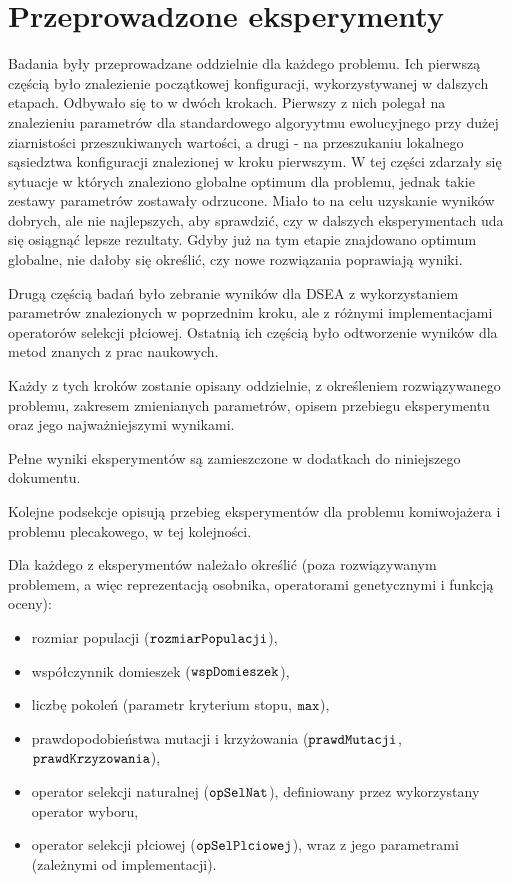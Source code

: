 \documentclass[./FM_mgr.tex]{subfiles}
\begin{document}
	\section{Przeprowadzone eksperymenty}
	
	Badania były przeprowadzane oddzielnie dla każdego problemu.
	Ich pierwszą częścią było znalezienie początkowej konfiguracji, wykorzystywanej w dalszych etapach.
	Odbywało się to w dwóch krokach.
	Pierwszy z nich polegał na znalezieniu parametrów dla standardowego algoryytmu ewolucyjnego przy dużej ziarnistości przeszukiwanych wartości, a drugi - na przeszukaniu lokalnego sąsiedztwa konfiguracji znalezionej w kroku pierwszym.
	W tej części zdarzały się sytuacje w których znaleziono globalne optimum dla problemu, jednak takie zestawy parametrów zostawały odrzucone.
	Miało to na celu uzyskanie wyników dobrych, ale nie najlepszych, aby sprawdzić, czy w dalszych eksperymentach uda się osiągnąć lepsze rezultaty.
	Gdyby już na tym etapie znajdowano optimum globalne, nie dałoby się określić, czy nowe rozwiązania poprawiają wyniki.
	
	Drugą częścią badań było zebranie wyników dla DSEA z wykorzystaniem parametrów znalezionych w poprzednim kroku, ale z różnymi implementacjami operatorów selekcji płciowej.
	Ostatnią ich częścią było odtworzenie wyników dla metod znanych z prac naukowych.
	
	Każdy z tych kroków zostanie opisany oddzielnie, z określeniem rozwiązywanego problemu, zakresem zmienianych parametrów, opisem przebiegu eksperymentu oraz jego najważniejszymi wynikami.
	
	Pełne wyniki eksperymentów są zamieszczone w dodatkach do niniejszego dokumentu.
	
	Kolejne podsekcje opisują przebieg eksperymentów dla problemu komiwojażera i problemu plecakowego, w tej kolejności.
	
	Dla każdego z eksperymentów należało określić (poza rozwiązywanym problemem, a więc reprezentacją osobnika, operatorami genetycznymi i funkcją oceny):
	
	\begin{itemize}
		\item rozmiar populacji ($\mathtt{rozmiarPopulacji}$),
		\item współczynnik domieszek ($\mathtt{wspDomieszek}$),
		\item liczbę pokoleń (parametr kryterium stopu, $\mathtt{max}$),
		\item prawdopodobieństwa mutacji i krzyżowania ($\mathtt{prawdMutacji}$, $\mathtt{prawdKrzyzowania}$),
		\item operator selekcji naturalnej ($\mathtt{opSelNat}$), definiowany przez wykorzystany operator wyboru,
		\item operator selekcji płciowej ($\mathtt{opSelPlciowej}$), wraz z jego parametrami (zależnymi od implementacji).
	\end{itemize}
	
\end{document}
